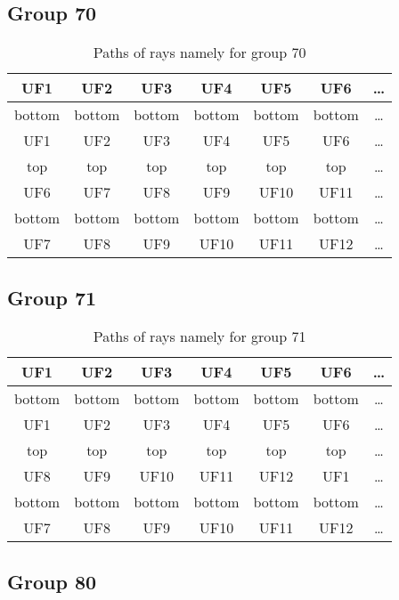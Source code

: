 \subsection*{Group 70}



\begin{table}[h!]
\centering
\begin{tabular}{|c|c|c|c|c|c|c|}
\hline
UF1 & UF2 & UF3 & UF4 & UF5 & UF6 & \dots \\
\hline
bottom & bottom & bottom & bottom & bottom & bottom & \dots \\
\hline
UF1 & UF2 & UF3 & UF4 & UF5 & UF6 & \dots \\
\hline
top & top & top & top & top & top & \dots \\
\hline
UF6 & UF7 & UF8 & UF9 & UF10 & UF11 & \dots \\
\hline
bottom & bottom & bottom & bottom & bottom & bottom & \dots \\
\hline
UF7 & UF8 & UF9 & UF10 & UF11 & UF12 & \dots \\
\hline
\end{tabular}
\caption{Paths of rays namely for group 70}
\label{table:TableGroup70}
\end{table}
\newpage
\subsection*{Group 71}



\begin{table}[h!]
\centering
\begin{tabular}{|c|c|c|c|c|c|c|}
\hline
UF1 & UF2 & UF3 & UF4 & UF5 & UF6 & \dots \\
\hline
bottom & bottom & bottom & bottom & bottom & bottom & \dots \\
\hline
UF1 & UF2 & UF3 & UF4 & UF5 & UF6 & \dots \\
\hline
top & top & top & top & top & top & \dots \\
\hline
UF8 & UF9 & UF10 & UF11 & UF12 & UF1 & \dots \\
\hline
bottom & bottom & bottom & bottom & bottom & bottom & \dots \\
\hline
UF7 & UF8 & UF9 & UF10 & UF11 & UF12 & \dots \\
\hline
\end{tabular}
\caption{Paths of rays namely for group 71}
\label{table:TableGroup71}
\end{table}
\newpage
\subsection*{Group 80}






